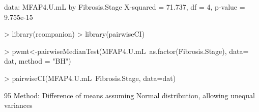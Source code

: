 \documentclass{article}
\begin{document}
\begin{enumerate}
\begin{Schunk}
\begin{Soutput}
data:  MFAP4.U.mL by Fibrosis.Stage
X-squared = 71.737, df = 4, p-value = 9.755e-15
\end{Soutput}
\begin{Sinput}
> library(rcompanion)
> library(pairwiseCI)
\end{Sinput}
\end{Schunk}
\begin{Schunk}
\begin{Sinput}
> pwmt<-pairwiseMedianTest(MFAP4.U.mL~as.factor(Fibrosis.Stage), data= dat, method = "BH")
\end{Sinput}
\end{Schunk}
\begin{Schunk}
\begin{Sinput}
> pairwiseCI(MFAP4.U.mL~Fibrosis.Stage, data=dat)
\end{Sinput}
\begin{Soutput}
95 %
 Method:  Difference of means assuming Normal distribution, allowing unequal variances 
  

\end{Soutput}
\end{Schunk}
\end{enumerate}
\end{document}
